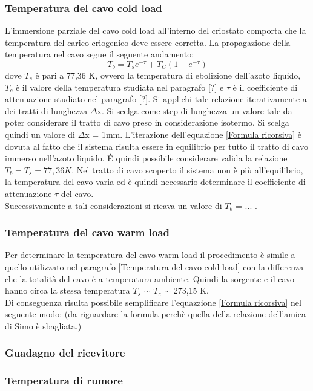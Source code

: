 \subsubsection{Temperatura del cavo cold load}
L'immersione parziale del cavo cold load all'interno del criostato comporta che la temperatura del carico criogenico deve essere corretta. La propagazione della temperatura nel cavo segue il seguente andamento:
\begin{equation}
T_{b}= T_{s}e^{-\tau} + T_{C}(1-e^{-\tau})
\label{Formula ricorsiva}
\end{equation}
dove $T_{s}$ è pari a 77,36 K, ovvero la temperatura di ebolizione dell'azoto liquido, $T_{c}$ è il valore della temperatura studiata nel paragrafo [?] e $\tau$ è il coefficiente di attenuazione studiato nel paragrafo [?].
Si applichi tale relazione iterativamente a dei tratti di lunghezza $\Delta$x. Si scelga come step di lunghezza un valore tale da poter considerare il tratto di cavo preso in considerazione isotermo. Si scelga quindi un valore di $\Delta$x = 1mm.
L'iterazione dell'equazione \eqref{Formula ricorsiva} è dovuta al fatto che il sistema risulta essere in equilibrio per tutto il tratto di cavo immerso nell'azoto liquido. \'E quindi possibile considerare valida la relazione $T_{b} = T_{s} = 77,36 K$. Nel tratto di cavo scoperto il sistema non è più all'equilibrio, la temperatura del cavo varia ed è quindi necessario determinare il coefficiente di attenuazione $\tau$ del cavo.\\
Successivamente a tali considerazioni si ricava un valore di $T_{b}$ = ... .

\subsubsection{Temperatura del cavo warm load}\label{Temperatura del cavo warm load}
Per determinare la temperatura del cavo warm load il procedimento è simile a quello utilizzato nel paragrafo \ref{Temperatura del cavo cold load} con la differenza che la totalità del cavo è a temperatura ambiente. Quindi la sorgente e il cavo hanno circa la stessa temperatura $T_{s}$ $\sim$ $T_{c}$ $\sim$ 273,15 K.\\
Di conseguenza risulta possibile semplificare l'equazzione \eqref{Formula ricorsiva} nel seguente modo:
(da riguardare la formula perchè quella della relazione dell'amica di Simo è sbagliata.)
\subsubsection{Guadagno del ricevitore}
\subsubsection{Temperatura di rumore}
